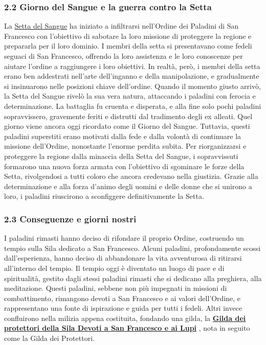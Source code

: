 \subsubsection{\texorpdfstring{2.2 \textbf{Giorno del Sangue e la guerra
contro la
Setta}}{2.2 Giorno del Sangue e la guerra contro la Setta}}\label{giorno-del-sangue-e-la-guerra-contro-la-setta}

La
\href{Setta\%20del\%20Sangue\%202859c4de945546eda0cee6fb151ef956.md}{Setta
del Sangue} ha iniziato a infiltrarsi nell'Ordine dei Paladini di San
Francesco con l'obiettivo di sabotare la loro missione di proteggere la
regione e prepararla per il loro dominio. I membri della setta si
presentavano come fedeli seguaci di San Francesco, offrendo la loro
assistenza e le loro conoscenze per aiutare l'ordine a raggiungere i
loro obiettivi. In realtà, però, i membri della setta erano ben
addestrati nell'arte dell'inganno e della manipolazione, e gradualmente
si insinuarono nelle posizioni chiave dell'ordine. Quando il momento
giusto arrivò, la Setta del Sangue rivelò la sua vera natura, attaccando
i paladini con ferocia e determinazione. La battaglia fu cruenta e
disperata, e alla fine solo pochi paladini sopravvissero, gravemente
feriti e distrutti dal tradimento degli ex alleati. Quel giorno viene
ancora oggi ricordato come il Giorno del Sangue. Tuttavia, questi
paladini superstiti erano motivati dalla fede e dalla volontà di
continuare la missione dell'Ordine, nonostante l'enorme perdita subita.
Per riorganizzarsi e proteggere la regione dalla minaccia della Setta
del Sangue, i sopravvissuti formarono una nuova forza armata con
l'obiettivo di sgominare le forze della Setta, rivolgendosi a tutti
coloro che ancora credevano nella giustizia. Grazie alla determinazione
e alla forza d'animo degli uomini e delle donne che si unirono a loro, i
paladini riuscirono a sconfiggere definitivamente la Setta.

\subsubsection{2.3 Conseguenze e giorni
nostri}\label{conseguenze-e-giorni-nostri}

I paladini rimasti hanno deciso di rifondare il proprio Ordine,
costruendo un tempio sulla Sila dedicato a San Francesco. Alcuni
paladini, profondamente scossi dall'esperienza, hanno deciso di
abbandonare la vita avventurosa di ritirarsi all'interno del tempio. Il
tempio oggi è diventato un luogo di pace e di spiritualità, gestito
dagli stessi paladini rimasti che si dedicano alla preghiera, alla
meditazione. Questi paladini, sebbene non più impegnati in missioni di
combattimento, rimangono devoti a San Francesco e ai valori dell'Ordine,
e rappresentano una fonte di ispirazione e guida per tutti i fedeli.
Altri invece confluirono nella milizia appena costituita, fondando una
gilda, la
\href{Gilda\%20dei\%20protettori\%20della\%20Sila\%20Devoti\%20a\%20San\%20Franc\%20e29bb7909af24fee931336355db913d4.md}{\textbf{Gilda
dei protettori della Sila Devoti a San Francesco e ai Lupi}} , nota in
seguito come la Gilda dei Protettori.

